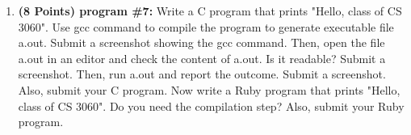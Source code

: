 \documentclass[paper=letter, fontsize=11pt]{scrartcl} %
\begin{document}
\begin{enumerate}[noitemsep]
         \item \textbf{(8 Points) program \#7:} Write a C program that prints "Hello, class of CS 3060". 
Use gcc command to compile the program to generate executable file a.out. Submit a screenshot showing the gcc command. 
Then, open the file a.out in an editor and check the content of a.out. Is it readable? Submit a screenshot. 
Then, run a.out and report the outcome. Submit a screenshot. Also, submit your C program.
Now write  a Ruby program that prints "Hello, class of CS 3060". Do you need the compilation step? Also, submit your Ruby program.  
    
\end{enumerate}
 
\end{document}

